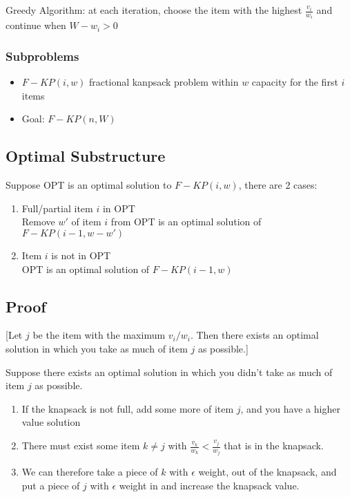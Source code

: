 \documentclass{article}
\begin{document}
Greedy Algorithm: at each iteration, choose the item with the highest \(\frac{v_i}{w_i}\) and continue when \(W - w_i > 0\)

\subsubsection*{Subproblems}
\begin{itemize}
    \item \(F-KP(i, w)\) fractional kanpsack problem within \(w\) capacity for the first \(i\) items
    \item Goal: \(F-KP(n, W)\)
\end{itemize}

\subsection*{Optimal Substructure}
Suppose OPT is an optimal solution to \(F-KP(i, w)\), there are 2 cases:
\begin{enumerate}
    \item Full/partial item \(i\) in OPT \\
          Remove \(w'\) of item \(i\) from OPT is an optimal solution of \(F-KP(i -1, w-w')\)
    \item Item \(i\) is not in OPT \\
          OPT is an optimal solution of \(F-KP(i-1, w)\)
\end{enumerate}

\subsection*{Proof}
[Let \(j\) be the item with the maximum \(v_i / w_i\).
    Then there exists an optimal solution in which you take as much of item \(j\) as possible.]

Suppose there exists an optimal solution in which you didn't take as much of item \(j\) as possible.

\begin{enumerate}
    \item If the knapsack is not full, add some more of item \(j\), and you have a higher value solution
    \item There must exist some item \(k \neq j\) with \(\frac{v_k}{w_k} < \frac{v_j}{w_j}\) that is in the knapsack.
    \item We can therefore take a piece of \(k\) with \(\epsilon\) weight, out
          of the knapsack, and put a piece of \(j\) with \(\epsilon\) weight in and
          increase the knapsack value.
\end{enumerate}
\end{document}
